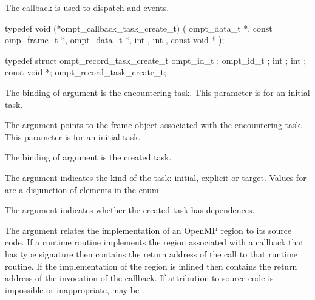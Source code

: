 \label{sec:ompt_callback_task_create_t}
\summary
The  callback is used to dispatch
 and  events.

\format
\begin{ccppspecific}
\begin{omptCallback}
typedef void (*ompt_callback_task_create_t) (
  ompt_data_t *,
  const omp_frame_t *,
  ompt_data_t *,
  int ,
  int ,
  const void *
);
\end{omptCallback}
\end{ccppspecific}


\record
\begin{ccppspecific}
\begin{omptRecord}
typedef struct ompt_record_task_create_t {
  ompt_id_t ;
  ompt_id_t ;
  int ;
  int ;
  const void *;
} ompt_record_task_create_t;
\end{omptRecord}
\end{ccppspecific}


\argdesc

The binding of argument  is the
encountering task.
This parameter is  for an initial task.

The argument  points to the frame object
associated with the encountering task.
This parameter is  for an initial task.

The binding of argument  is the created
task.

The argument  indicates the kind of the task: initial,
explicit or target.
Values for  are a disjunction of elements in the enum
.

The argument  indicates whether the created
task has dependences.

The  argument relates the implementation of an OpenMP region
to its source code. If a runtime routine implements the region associated with
a callback that has type signature  then
 contains the return address of the call to that runtime routine.
If the implementation of the region is inlined then  contains the
return address of the invocation of the callback. If attribution to source code
is impossible or inappropriate, may be .


